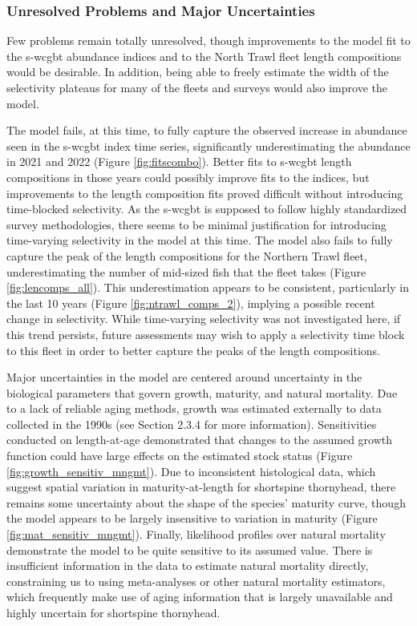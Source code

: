 \documentclass[11pt,
  english,
  letterpaper,
]{article}
\begin{document}
\hypertarget{unresolved-problems-and-major-uncertainties-1}{%
\subsubsection{Unresolved Problems and Major Uncertainties}\label{unresolved-problems-and-major-uncertainties-1}}

Few problems remain totally unresolved, though improvements to the model fit to the \gls{s-wcgbt} abundance indices and to the North Trawl fleet length compositions would be desirable. In addition, being able to freely estimate the width of the selectivity plateaus for many of the fleets and surveys would also improve the model.

The model fails, at this time, to fully capture the observed increase in abundance seen in the \gls{s-wcgbt} index time series, significantly underestimating the abundance in 2021 and 2022 (Figure \ref{fig:fitscombo}). Better fits to \gls{s-wcgbt} length compositions in those years could possibly improve fits to the indices, but improvements to the length composition fits proved difficult without introducing time-blocked selectivity. As the \gls{s-wcgbt} is supposed to follow highly standardized survey methodologies, there seems to be minimal justification for introducing time-varying selectivity in the model at this time. The model also fails to fully capture the peak of the length compositions for the Northern Trawl fleet, underestimating the number of mid-sized fish that the fleet takes (Figure \ref{fig:lencomps_all}). This underestimation appears to be consistent, particularly in the last 10 years (Figure \ref{fig:ntrawl_comps_2}), implying a possible recent change in selectivity. While time-varying selectivity was not investigated here, if this trend persists, future assessments may wish to apply a selectivity time block to this fleet in order to better capture the peaks of the length compositions.

Major uncertainties in the model are centered around uncertainty in the biological parameters that govern growth, maturity, and natural mortality. Due to a lack of reliable aging methods, growth was estimated externally to data collected in the 1990s (see Section 2.3.4 for more information). Sensitivities conducted on length-at-age demonstrated that changes to the assumed growth function could have large effects on the estimated stock status (Figure \ref{fig:growth_sensitiv_mngmt}). Due to inconsistent histological data, which suggest spatial variation in maturity-at-length for shortspine thornyhead, there remains some uncertainty about the shape of the species' maturity curve, though the model appears to be largely insensitive to variation in maturity (Figure \ref{fig:mat_sensitiv_mngmt}). Finally, likelihood profiles over natural mortality demonstrate the model to be quite sensitive to its assumed value. There is insufficient information in the data to estimate natural mortality directly, constraining us to using meta-analyses or other natural mortality estimators, which frequently make use of aging information that is largely unavailable and highly uncertain for shortspine thornyhead.
\end{document}
